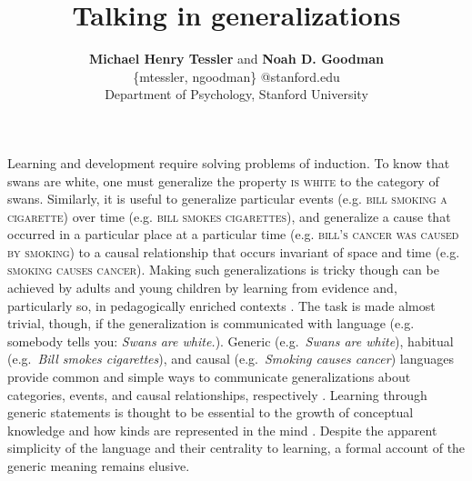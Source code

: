 \documentclass[11pt,letterpaper]{article}
\title{Talking in generalizations}
\author{{\large \bf Michael Henry Tessler} and {\large \bf Noah D. Goodman} \\
\{mtessler, ngoodman\} @stanford.edu\\
  Department of Psychology, Stanford University}
\begin{document}
\maketitle

Learning and development require solving problems of induction.
To know that swans are white, one must generalize the property \textsc{is white} to the category of swans.
Similarly, it is useful to generalize particular events (e.g. \textsc{bill smoking a cigarette}) over time (e.g. \textsc{bill smokes cigarettes}), and generalize a cause that occurred in a particular place at a particular time (e.g. \textsc{bill's cancer was caused by smoking}) to a causal relationship that occurs invariant of space and time (e.g. \textsc{smoking causes cancer}).
Making such generalizations is tricky though can be achieved by adults and young children by learning from evidence
and, particularly so, in pedagogically enriched contexts \cite{Markman1989, Shafto2012}.
The task is made almost trivial, though, if the generalization is communicated with language (e.g. somebody tells you: \emph{Swans are white.}).
Generic (e.g.~\emph{Swans are white}), habitual (e.g.~\emph{Bill smokes cigarettes}), and causal (e.g.~\emph{Smoking causes cancer}) languages provide common and simple ways to communicate generalizations about categories, events, and causal relationships, respectively \cite{Carlson1977, Carlson2005, Cohen1999, Leslie2008}. 
Learning through generic statements is thought to be essential to the growth of conceptual knowledge \cite{Gelman2004} and how kinds are represented in the mind \cite{Leslie2008}.
Despite the apparent simplicity of the language and their centrality to learning, a formal account of the generic meaning remains elusive. 
\end{document}
